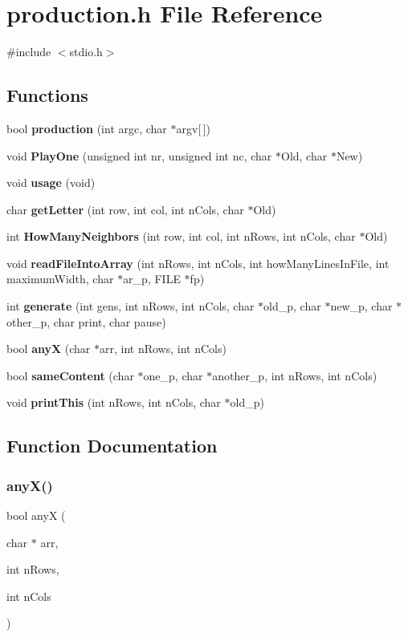 \section{production.\+h File Reference}
\label{production_8h}
{\ttfamily \#include $<$stdio.\+h$>$}\newline
\subsection*{Functions}
\begin{DoxyCompactItemize}
\item 
bool \textbf{ production} (int argc, char $\ast$argv[$\,$])
\item 
void \textbf{ Play\+One} (unsigned int nr, unsigned int nc, char $\ast$Old, char $\ast$New)
\item 
void \textbf{ usage} (void)
\item 
char \textbf{ get\+Letter} (int row, int col, int n\+Cols, char $\ast$Old)
\item 
int \textbf{ How\+Many\+Neighbors} (int row, int col, int n\+Rows, int n\+Cols, char $\ast$Old)
\item 
void \textbf{ read\+File\+Into\+Array} (int n\+Rows, int n\+Cols, int how\+Many\+Lines\+In\+File, int maximum\+Width, char $\ast$ar\+\_\+p, F\+I\+LE $\ast$fp)
\item 
int \textbf{ generate} (int gens, int n\+Rows, int n\+Cols, char $\ast$old\+\_\+p, char $\ast$new\+\_\+p, char $\ast$other\+\_\+p, char print, char pause)
\item 
bool \textbf{ anyX} (char $\ast$arr, int n\+Rows, int n\+Cols)
\item 
bool \textbf{ same\+Content} (char $\ast$one\+\_\+p, char $\ast$another\+\_\+p, int n\+Rows, int n\+Cols)
\item 
void \textbf{ print\+This} (int n\+Rows, int n\+Cols, char $\ast$old\+\_\+p)
\end{DoxyCompactItemize}


\subsection{Function Documentation}
\mbox{\label{production_8h_a85f4ceb7eddb00ab9989daf800a74d3f}} 
\subsubsection{any\+X()}
{\footnotesize\ttfamily bool anyX (\begin{DoxyParamCaption}\item[{char $\ast$}]{arr,  }\item[{int}]{n\+Rows,  }\item[{int}]{n\+Cols }\end{DoxyParamCaption})}

